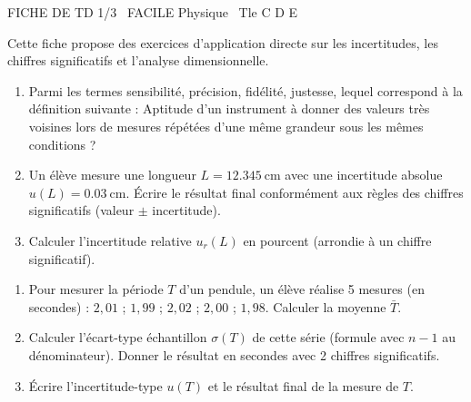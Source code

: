\documentclass[11pt]{article}
\begin{document}
\begin{tcolorbox}[enhanced,colback=popink,colframe=popink,arc=10pt,boxrule=0pt,left=12pt,right=12pt,top=9pt,bottom=9pt]
{\color{white}\popxbold\small FICHE DE TD 1/3 \textbullet\ FACILE \hfill Physique \textbullet\ Tle C D E\par}
\end{tcolorbox}
\vspace{4pt}
Cette fiche propose des exercices d'application directe sur les incertitudes, les chiffres significatifs et l'analyse dimensionnelle.

\begin{exercice}
\begin{enumerate}
    \item Parmi les termes \og sensibilité\fg, \og précision\fg, \og fidélité\fg, \og justesse\fg, lequel correspond à la définition suivante : \og Aptitude d'un instrument à donner des valeurs très voisines lors de mesures répétées d'une même grandeur sous les mêmes conditions \fg ?
    \item Un élève mesure une longueur $L = \SI{12,345}{\centi\metre}$ avec une incertitude absolue $u(L) = \SI{0,03}{\centi\metre}$. Écrire le résultat final conformément aux règles des chiffres significatifs (valeur $\pm$ incertitude).
    \item Calculer l'incertitude relative $u_r(L)$ en pourcent (arrondie à un chiffre significatif).
\end{enumerate}
\end{exercice}

\begin{exercice}
\begin{enumerate}
    \item Pour mesurer la période $T$ d'un pendule, un élève réalise 5 mesures (en secondes) : $2,01$ ; $1,99$ ; $2,02$ ; $2,00$ ; $1,98$. Calculer la moyenne $\bar{T}$.
    \item Calculer l'écart-type échantillon $\sigma(T)$ de cette série (formule avec $n-1$ au dénominateur). Donner le résultat en secondes avec 2 chiffres significatifs.
    \item Écrire l'incertitude-type $u(T)$ et le résultat final de la mesure de $T$.
\end{enumerate}
\end{exercice}
\end{document}
